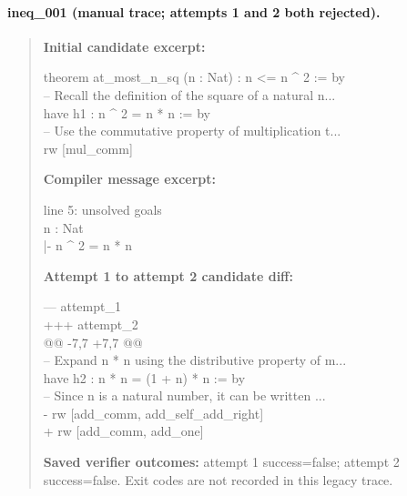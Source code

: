 \paragraph{ineq\_001 (manual trace; attempts 1 and 2 both rejected).}
\begin{quote}\small
\textbf{Initial candidate excerpt:}\par\ttfamily
theorem at\_most\_n\_sq (n : Nat) : n <= n \textasciicircum{} 2 := by\\
  -- Recall the definition of the square of a natural n...\\
  have h1 : n \textasciicircum{} 2 = n * n := by\\
    -- Use the commutative property of multiplication t...\\
    rw [mul\_comm]\\
\par\textbf{Compiler message excerpt:}\par\ttfamily
line 5: unsolved goals\\
n : Nat\\
|- n \textasciicircum{} 2 = n * n\\
\par\textbf{Attempt 1 to attempt 2 candidate diff:}\par\ttfamily
--- attempt\_1\\
+++ attempt\_2\\
@@ -7,7 +7,7 @@\\
   -- Expand n * n using the distributive property of m...\\
   have h2 : n * n = (1 + n) * n := by\\
     -- Since n is a natural number, it can be written ...\\
-    rw [add\_comm, add\_self\_add\_right]\\
+    rw [add\_comm, add\_one]\\
\par\textbf{Saved verifier outcomes:} attempt 1 success=false; attempt 2 success=false. Exit codes are not recorded in this legacy trace.
\end{quote}
